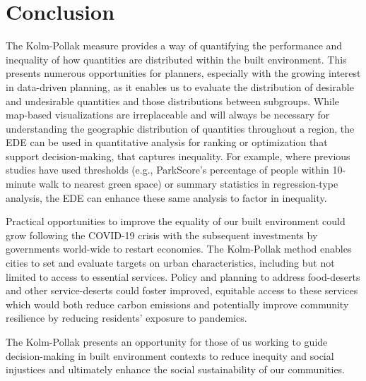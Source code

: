 \documentclass[final,3p,times,onecolumn,sort&compress]{elsarticle}
\begin{document}

\section{Conclusion}
The Kolm-Pollak measure provides a way of quantifying the performance and inequality of how quantities are distributed within the built environment.
This presents numerous opportunities for planners, especially with the growing interest in data-driven planning, as it enables us to evaluate the distribution of desirable and undesirable quantities and those distributions between subgroups.
While map-based visualizations are irreplaceable and will always be necessary for understanding the geographic distribution of quantities throughout a region, the EDE can be used in quantitative analysis for ranking or optimization that support decision-making, that captures inequality.
For example, where previous studies have used thresholds (e.g., ParkScore's percentage of people within 10-minute walk to nearest green space) or summary statistics in regression-type analysis, the EDE can enhance these same analysis to factor in inequality.

Practical opportunities to improve the equality of our built environment could grow following the COVID-19 crisis with the subsequent investments by governments world-wide to restart economies.
The Kolm-Pollak method enables cities to set and evaluate targets on urban characteristics, including but not limited to access to essential services. 
Policy and planning to address food-deserts and other service-deserts could foster improved, equitable access to these services which would both reduce carbon emissions and potentially improve community resilience by reducing residents' exposure to pandemics.

The Kolm-Pollak presents an opportunity for those of us working to guide decision-making in built environment contexts to reduce inequity and social injustices and ultimately enhance the  social sustainability of our communities.



\clearpage
\newpage
\linenumbers
\appendix
\section{}
\end{document}
